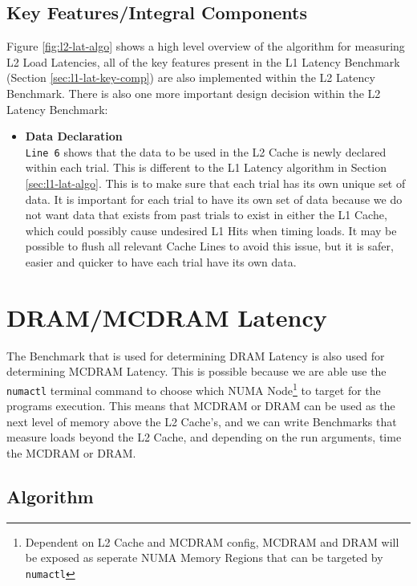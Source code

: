 \documentclass[bsc,frontabs,twoside,singlespacing,parskip,deptreport]{infthesis}     %
\begin{document}
\subsection{Key Features/Integral Components}\label{sec:l2-lat-key-comp}
Figure \ref{fig:l2-lat-algo} shows a high level overview of the algorithm for measuring L2 Load Latencies, all of the key features present in the L1 Latency Benchmark (Section \ref{sec:l1-lat-key-comp}) are also implemented within the L2 Latency Benchmark. There is also one more important design decision within the L2 Latency Benchmark:
\begin{itemize}
    \item{{\bf Data Declaration} \\
    \texttt{Line 6} shows that the data to be used in the L2 Cache is newly declared within each trial. This is different to the L1 Latency algorithm in Section \ref{sec:l1-lat-algo}. This is to make sure that each trial has its own unique set of data. It is important for each trial to have its own set of data because we do not want data that exists from past trials to exist in either the L1 Cache, which could possibly cause undesired L1 Hits when timing loads. It may be possible to flush all relevant Cache Lines to avoid this issue, but it is safer, easier and quicker to have each trial have its own data.
    }\label{data-declaration-consideration-L2}
\end{itemize}


\newpage

\section{DRAM/MCDRAM Latency}\label{mcdram-dram-benchmarks-lat}
The Benchmark that is used for determining DRAM Latency is also used for determining MCDRAM Latency. This is possible because we are able use the \texttt{numactl}\cite{numactl_man} terminal command to choose which NUMA Node\footnote{Dependent on L2 Cache and MCDRAM config, MCDRAM and DRAM will be exposed as seperate NUMA Memory Regions that can be targeted by \texttt{numactl}} to target for the programs execution. This means that MCDRAM or DRAM can be used as the next level of memory above the L2 Cache's, and we can write Benchmarks that measure loads beyond the L2 Cache, and depending on the run arguments, time the MCDRAM or DRAM.
\subsection{Algorithm}
\end{document}
